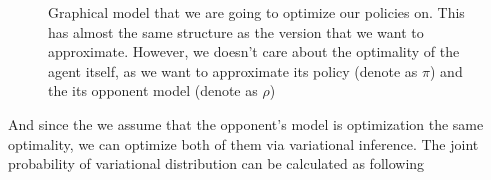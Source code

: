 \begin{figure}[ht]
    \begin{minipage}[t]{0.5\linewidth}
    \centering
    \end{minipage}%
    \begin{minipage}[t]{0.5\linewidth}
    \caption{Graphical model that we are going to optimize our policies on. This has almost the same structure as the version that we want to approximate. However, we doesn't care about the optimality of the agent itself, as we want to approximate its policy (denote as $\pi$) and the its opponent model (denote as $\rho$)}
    \label{fig:chap3-variational-ROMMEO}
    \end{minipage}
\end{figure}
And since the we assume that the opponent's model is optimization the same optimality, we can optimize both of them via variational inference. The joint probability of variational distribution can be calculated as following 
